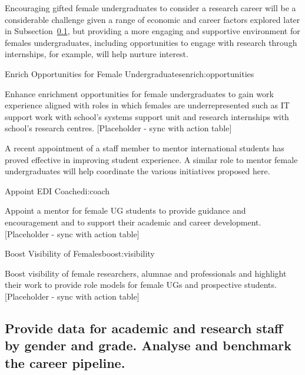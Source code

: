 Encouraging gifted female undergraduates to consider a research career 
will be a considerable challenge given a range of economic and career 
factors explored later in Subsection~\ref{subsec:academic_research}, 
but providing a more engaging and supportive environment for females 
undergraduates, including opportunities to engage with research through 
internships, for example, will help nurture interest. 


\newcommand{\actenrichopportunities}{
Enhance enrichment opportunities  for female undergraduates to gain  
work experience aligned with roles in which females are underrepresented  
such as IT support work  with school’s systems support unit and research  
internships with school’s research centres. 
[Placeholder  - sync with action table]
}
\begin{actionblock}{\ksspace{}Enrich Opportunities for Female Undergraduates}{enrich:opportunities}
\actenrichopportunities
\hfill{
    \hypersetup{hidelinks}
    \hyperlink{b0}{\gotoactionsymbol{}}
}
\end{actionblock}

A recent appointment of a staff member to mentor international students
has proved effective in improving student experience. A similar role 
to mentor female undergraduates will help coordinate the various initiatives
proposed here.

\newcommand{\actedicoach}{
Appoint a mentor for female UG students to provide guidance and  
encouragement and to support their academic and career development. 
[Placeholder  - sync with action table]
}
\begin{actionblock}{\ksspace{}Appoint EDI Coach}{edi:coach}
\actedicoach 
\hfill{
    \hypersetup{hidelinks}
    \hyperlink{b0}{\gotoactionsymbol{}}
}
\end{actionblock}


\newcommand{\actboostvisibility}{
Boost visibility of female researchers, alumnae and professionals and  
highlight their work to  provide role models for female UGs and 
prospective students.
[Placeholder  - sync with action table]
}
\begin{actionblock}{\ksspace{}Boost Visibility of Females}{boost:visibility}
\actboostvisibility
\hfill{
    \hypersetup{hidelinks}
    \hyperlink{b0}{\gotoactionsymbol{}}
}
\end{actionblock}



\subsection{Provide data for academic and research staff by gender and grade. Analyse and benchmark the career pipeline.}
\label{subsec:academic_research}


